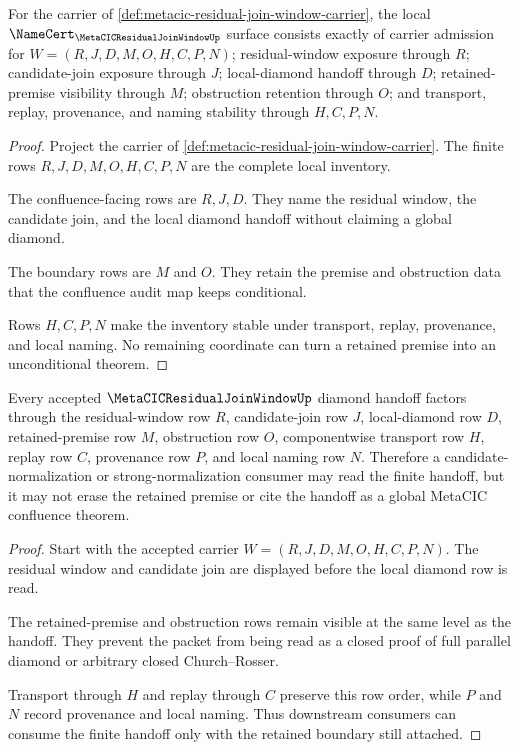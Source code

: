 \begin{theorem}
\label{thm:metacic-residual-join-window-namecert-obligations}
For the carrier of \autoref{def:metacic-residual-join-window-carrier}, the local $\NameCert_{\MetaCICResidualJoinWindowUp}$ surface consists exactly of carrier admission for $W=(R,J,D,M,O,H,C,P,N)$; residual-window exposure through $R$; candidate-join exposure through $J$; local-diamond handoff through $D$; retained-premise visibility through $M$; obstruction retention through $O$; and transport, replay, provenance, and naming stability through $H,C,P,N$.
\end{theorem}
\begin{proof}
Project the carrier of \autoref{def:metacic-residual-join-window-carrier}. The finite rows $R,J,D,M,O,H,C,P,N$ are the complete local inventory.

The confluence-facing rows are $R,J,D$. They name the residual window, the candidate join, and the local diamond handoff without claiming a global diamond.

The boundary rows are $M$ and $O$. They retain the premise and obstruction data that the confluence audit map keeps conditional.

Rows $H,C,P,N$ make the inventory stable under transport, replay, provenance, and local naming. No remaining coordinate can turn a retained premise into an unconditional theorem.
\end{proof}

\begin{theorem}
\label{thm:metacic-residual-join-window-diamond-handoff}
Every accepted $\MetaCICResidualJoinWindowUp$ diamond handoff factors through the residual-window row $R$, candidate-join row $J$, local-diamond row $D$, retained-premise row $M$, obstruction row $O$, componentwise transport row $H$, replay row $C$, provenance row $P$, and local naming row $N$. Therefore a candidate-normalization or strong-normalization consumer may read the finite handoff, but it may not erase the retained premise or cite the handoff as a global MetaCIC confluence theorem.
\end{theorem}
\begin{proof}
Start with the accepted carrier $W=(R,J,D,M,O,H,C,P,N)$. The residual window and candidate join are displayed before the local diamond row is read.

The retained-premise and obstruction rows remain visible at the same level as the handoff. They prevent the packet from being read as a closed proof of full parallel diamond or arbitrary closed Church--Rosser.

Transport through $H$ and replay through $C$ preserve this row order, while $P$ and $N$ record provenance and local naming. Thus downstream consumers can consume the finite handoff only with the retained boundary still attached.
\end{proof}

